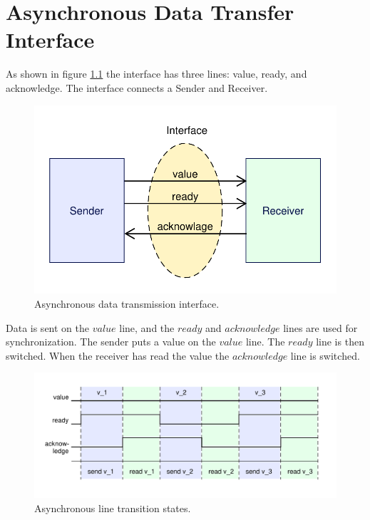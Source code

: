 
\chapter{Asynchronous Data Transfer Interface}

\label{AppendixA} %

As shown in figure \ref{fig:AsyncInterface} the interface has three lines: 
value, ready, and acknowledge. The interface connects a Sender and Receiver.

\begin{figure}[H]
	\centering
	\includegraphics[scale=0.75]{Figures/AsyncInterface.pdf}
	\decoRule
	\caption{Asynchronous data transmission interface.}
	\label{fig:AsyncInterface}
\end{figure}

Data is sent on the \(value\) line, and the \(ready\) and \(acknowledge\) lines are
used for synchronization. The sender puts a value on the \(value\) line. The 
\(ready\) line is then switched. When the receiver has read the value the 
\(acknowledge\) line is switched.

\begin{figure}[H]
	\centering
	\includegraphics[scale=0.75]{Figures/AsyncInterface_send.pdf}
	\decoRule
	\caption{Asynchronous line transition states.}
	\label{fig:AsyncInterface_send}
\end{figure}